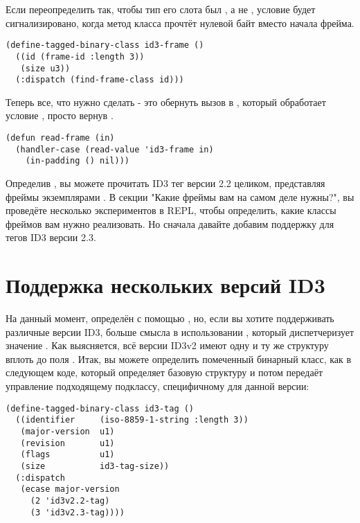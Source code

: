 Если переопределить  так, чтобы тип его слота  был
, а не , условие будет сигнализировано, когда метод
 класса  прочтёт нулевой байт вместо начала фрейма.

\begin{lstlisting}
(define-tagged-binary-class id3-frame ()
  ((id (frame-id :length 3))
   (size u3))
  (:dispatch (find-frame-class id)))
\end{lstlisting}

Теперь все, что нужно сделать  - это обернуть вызов  в
, который обработает условие , просто вернув
.

\begin{lstlisting}
(defun read-frame (in)
  (handler-case (read-value 'id3-frame in)
    (in-padding () nil)))
\end{lstlisting}

Определив , вы можете прочитать ID3 тег версии 2.2 целиком, представляя
фреймы экземплярами . В секции "Какие фреймы вам на самом деле
нужны?", вы проведёте несколько экспериментов в REPL, чтобы определить, какие классы
фреймов вам нужно реализовать. Но сначала давайте добавим поддержку для тегов ID3 версии
2.3.

\section{Поддержка нескольких версий ID3}

На данный момент,  определён с помощью , но, если
вы хотите поддерживать различные версии ID3, больше смысла в использовании
, который диспетчеризует значение
. Как выясняется, всё версии ID3v2 имеют одну и ту же структуру вплоть
до поля . Итак, вы можете определить помеченный бинарный класс, как в следующем
коде, который определяет базовую структуру и потом передаёт управление подходящему
подклассу, специфичному для данной версии:

\begin{lstlisting}
(define-tagged-binary-class id3-tag ()
  ((identifier     (iso-8859-1-string :length 3))
   (major-version  u1)
   (revision       u1)
   (flags          u1)
   (size           id3-tag-size))
  (:dispatch 
   (ecase major-version
     (2 'id3v2.2-tag)
     (3 'id3v2.3-tag))))
\end{lstlisting}

